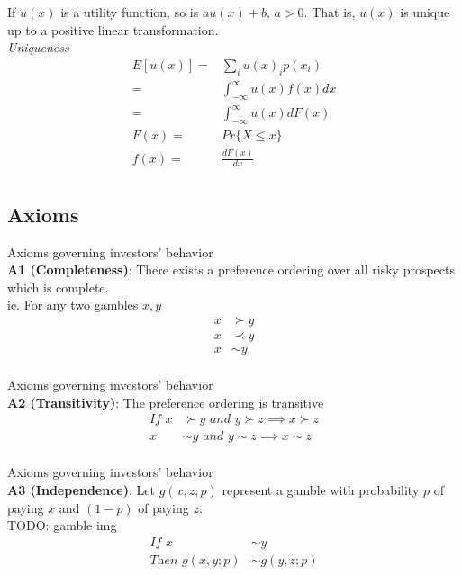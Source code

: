 \documentclass[
14pt,notheorems,hyperref={pdfauthor=whatever}
]{beamer}
\begin{document}
\begin{frame}
If $u(x)$ is a utility function, so is $au(x)+b\textit{, }a>0$. That is, $u(x)$ is unique up to a positive linear transformation. \\
\hfill \break
\textit{Uniqueness}
\begin{align*}
    E[u(x)] =& \sum_i u(x)_i p(x_i)\\
    =& \int_{-\infty}^\infty u(x)f(x)dx\\
    =& \int_{-\infty}^\infty u(x)dF(x)\\
    F(x) =& Pr\{X \leq x\}\\
    f(x) =& \frac{dF(x)}{dx}\\
\end{align*}
\end{frame}

\subsection{Axioms}

\begin{frame}
Axioms governing investors' behavior\\
\hfill \break
\textbf{A1 (Completeness)}: There exists a preference ordering over all risky prospects which is complete.\\
\hfill \break
ie. For any two gambles $x,y$
\hfill \break
\begin{align*}
    x &\succ y\\
    x &\prec y\\
    x &\sim y\\
\end{align*}
\end{frame}

\begin{frame}
Axioms governing investors' behavior\\
\hfill \break
\textbf{A2 (Transitivity)}: The preference ordering is transitive\\
\hfill \break
\begin{align*}
    \textit{If }x &\succ y \textit{ and } y \succ z \implies x \succ z\\
    x &\sim y \textit{ and } y \sim z \implies x \sim z\\
\end{align*}
\end{frame}

\begin{frame}
Axioms governing investors' behavior\\
\hfill \break
\textbf{A3 (Independence)}: Let $g(x,z;p)$ represent a gamble with probability $p$ of paying $x$ and $(1-p)$ of paying $z$.\\
TODO: gamble img\\
\hfill \break
\begin{align*}
    \textit{If }x &\sim y\\
    \textit{Then }g(x,y;p) &\sim g(y,z;p)\\
\end{align*}
\end{frame}
\end{document}
